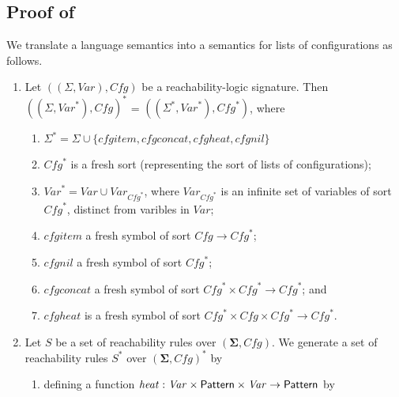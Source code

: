 \subsection{Proof of~}\label{app:CRLandRLcorrespondence}

\begin{definition}\label{def:starextension}
We translate a language semantics into a semantics for lists of configurations as follows.
\begin{enumerate}
    \item Let $((\Sigma, \mathit{Var}), \mathit{Cfg})$ be a reachability-logic signature.
          Then $((\Sigma, \mathit{Var}^*), \mathit{Cfg})^*$ = $((\Sigma^*, \mathit{Var}^*), \mathit{Cfg}^*)$,
          where
          \begin{enumerate}
              \item $\Sigma^* = \Sigma \cup \{ \mathit{cfgitem}, \mathit{cfgconcat}, \mathit{cfgheat}, \mathit{cfgnil} \}$
              \item $\mathit{Cfg}^*$ is a fresh sort (representing the sort of lists of configurations);
              \item $\mathit{Var}^* = \mathit{Var} \cup \mathit{Var}_{\mathit{Cfg}^*}$,
              where $\mathit{Var}_{\mathit{Cfg}^*}$ is an infinite set of variables of sort $\mathit{Cfg}^*$,
              distinct from varibles in $\mathit{Var}$;
              \item $\mathit{cfgitem}$ a fresh symbol of sort $\mathit{Cfg} \to \mathit{Cfg}^*$;
              \item $\mathit{cfgnil}$ a fresh symbol of sort $\mathit{Cfg}^*$;
              \item $\mathit{cfgconcat}$ a fresh symbol of sort $\mathit{Cfg}^* \times \mathit{Cfg}^* \to \mathit{Cfg}^*$; and
              \item $\mathit{cfgheat}$ is a fresh symbol of sort $\mathit{Cfg}^* \times \mathit{Cfg} \times \mathit{Cfg}^* \to \mathit{Cfg}^*$.
          \end{enumerate}
    \item Let $S$ be a set of reachability rules over $(\mathbf{\Sigma}, \mathit{Cfg})$.
          We generate a set of reachability rules $S^*$ over $(\mathbf{\Sigma}, \mathit{Cfg})^*$
          by
          \begin{enumerate}
              \item defining a function $\mathit{heat} : \mathit{Var} \times \mathsf{Pattern} \times \mathit{Var} \to \mathsf{Pattern}$ by
              \begin{align*}

\end{align*}
\end{enumerate}
\end{enumerate}
\end{definition}
